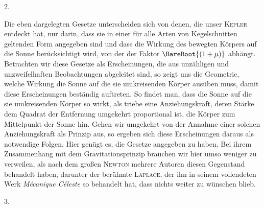 \par{}
\begin{center}
2.
\end{center}
Die eben dargelegten Gesetze unterscheiden sich von denen, die unser \textsc{Kepler} entdeckt hat, nur darin, dass sie in einer für alle Arten von Kegelschnitten geltenden Form angegeben sind und dass die Wirkung des bewegten Körpers auf die Sonne berücksichtigt wird, von der der Faktor $\BareRoot{(1+\mu)}$ abhängt. Betrachten wir diese Gesetze als Erscheinungen, die aus unzähligen und unzweifelhaften Beobachtungen abgeleitet sind, so zeigt uns die Geometrie, welche Wirkung
die Sonne auf die sie umkreisenden Körper ausüben muss, damit diese Erscheinungen beständig auftreten. So findet man, dass die Sonne auf die sie umkreisenden Körper so wirkt, als triebe eine Anziehungskraft, deren Stärke dem Quadrat der Entfernung umgekehrt proportional ist, die Körper zum Mittelpunkt der Sonne hin. Gehen wir umgekehrt von der Annahme einer solchen Anziehungskraft als Prinzip aus, so ergeben sich diese Erscheinungen daraus als notwendige Folgen. Hier genügt es, die Gesetze angegeben zu haben. Bei ihrem Zusammenhang mit dem Gravitationsprinzip brauchen wir hier umso weniger zu verweilen, als nach dem großen \textsc{Newton} mehrere Autoren diesen Gegenstand behandelt haben, darunter der berühmte \textsc{Laplace}, der ihn in seinem vollendeten Werk \textit{Mécanique Céleste} so behandelt hat, dass nichts weiter zu wünschen blieb.

\begin{center}
3.
\end{center}

